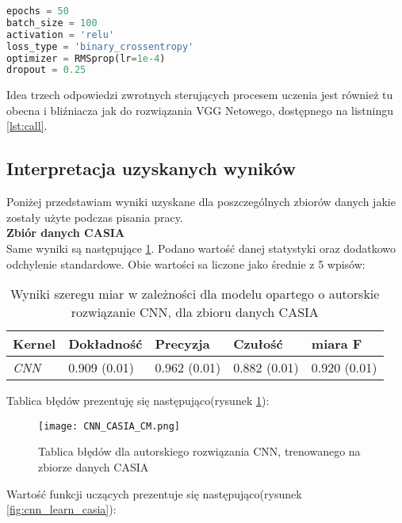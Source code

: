 \begin{lstlisting}[language=Python, caption=Parametry pracy modelu CNN, captionpos=b, label={lst:cnn_param}]
epochs = 50
batch_size = 100
activation = 'relu'
loss_type = 'binary_crossentropy'
optimizer = RMSprop(lr=1e-4)
dropout = 0.25
\end{lstlisting}

Idea trzech odpowiedzi zwrotnych sterujących procesem uczenia jest również tu obecna i bliźniacza jak do rozwiązania VGG Netowego, dostępnego na listningu \ref{lst:call}.

\subsection{Interpretacja uzyskanych wyników}

Poniżej przedstawiam wyniki uzyskane dla poszczególnych zbiorów danych jakie zostały użyte podczas pisania pracy.\\

\textbf{Zbiór danych CASIA} \\

Same wyniki są następujące \ref{tab:result_cnn}. Podano wartość danej statystyki oraz dodatkowo odchylenie standardowe. Obie wartości sa liczone jako średnie z 5 wpisów:
\begin{table}[H]
	\centering
	\begin{tabular}{|l|l|l|l|l|}
		\hline
		\textbf{Kernel} & \textbf{Dokładność} & \textbf{Precyzja} & \textbf{Czułość} & \textbf{miara F} \\ \hline
		\textit{CNN}  & 0.909 (0.01) & 0.962 (0.01) & 0.882 (0.01) & 0.920 (0.01) \\ \hline
	\end{tabular}
	\caption{Wyniki szeregu miar w zależności dla modelu opartego o autorskie rozwiązanie CNN, dla zbioru danych CASIA}
	\label{tab:result_cnn}
\end{table}

Tablica błędów prezentuję się następująco(rysunek \ref{fig:cnn_cm_casia}):

\begin{figure}[H]
	\texttt{[image: CNN\_CASIA\_CM.png]}
	\centering
	\caption{Tablica błędów dla autorskiego rozwiązania CNN, trenowanego na zbiorze danych CASIA}
	\label{fig:cnn_cm_casia}
\end{figure}

Wartość funkcji uczących prezentuje się następująco(rysunek \ref{fig:cnn_learn_casia}):

